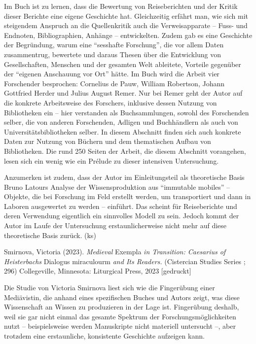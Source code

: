 \documentclass[a4paper,
fontsize=11pt,
oneside,
numbers=noperiodatend,
parskip=half-,
bibliography=totoc,
final
]{scrartcl}
\begin{document}
Im Buch ist zu lernen, dass die Bewertung von Reiseberichten und der
Kritik dieser Berichte eine eigene Geschichte hat. Gleichzeitig erfährt
man, wie sich mit steigendem Anspruch an die Quellenkritik auch die
Verweisapparate -- Fuss- und Endnoten, Bibliographien, Anhänge --
entwickelten. Zudem gab es eine Geschichte der Begründung, warum eine
\enquote{sesshafte Forschung}, die vor allem Daten zusammentrug,
bewertete und daraus Thesen über die Entwicklung von Gesellschaften,
Menschen und der gesamten Welt ableitete, Vorteile gegenüber der
\enquote{eigenen Anschauung vor Ort} hätte. Im Buch wird die Arbeit vier
Forschender besprochen: Cornelius de Pauw, William Robertson, Johann
Gottfried Herder und Julius August Remer. Nur bei Remer geht der Autor
auf die konkrete Arbeitsweise des Forschers, inklusive dessen Nutzung
von Bibliotheken ein -- hier verstanden als Buchsammlungen, sowohl des
Forschenden selber, die von anderen Forschenden, Adligen und
Buchhändlern als auch von Universitätsbibliotheken selber. In diesem
Abschnitt finden sich auch konkrete Daten zur Nutzung von Büchern und
dem thematischen Aufbau von Bibliotheken. Die rund 250 Seiten der
Arbeit, die diesem Abschnitt vorangehen, lesen sich ein wenig wie ein
Prélude zu dieser intensiven Untersuchung.

Anzumerken ist zudem, dass der Autor im Einleitungsteil als theoretische
Basis Bruno Latours Analyse der Wissensproduktion aus \enquote{immutable
mobiles} -- Objekte, die bei Forschung im Feld erstellt werden, um
transportiert und dann in Laboren ausgewertet zu werden -- einführt. Das
scheint für Reiseberichte und deren Verwendung eigentlich ein sinnvolles
Modell zu sein. Jedoch kommt der Autor im Laufe der Untersuchung
erstaunlicherweise nicht mehr auf diese theoretische Basis zurück. (ks)

Smirnova, Victoria (2023). \emph{Medieval} Exempla \emph{in Transition:
Caesarius of Heisterbachs} Dialogus miraculourm \emph{and Its Readers.}
(Cistercian Studies Series ; 296) Collegeville, Minnesota: Liturgical
Press, 2023 {[}gedruckt{]}

Die Studie von Victoria Smirnova liest sich wie die Fingerübung einer
Mediävistin, die anhand eines spezifischen Buches und Autors zeigt, was
diese Wissenschaft an Wissen zu produzieren in der Lage ist. Fingerübung
deshalb, weil sie gar nicht einmal das gesamte Spektrum der
Forschungsmöglichkeiten nutzt -- beispielsweise werden Manuskripte nicht
materiell untersucht --, aber trotzdem eine erstaunliche, konsistente
Geschichte aufzeigen kann.
\end{document}
